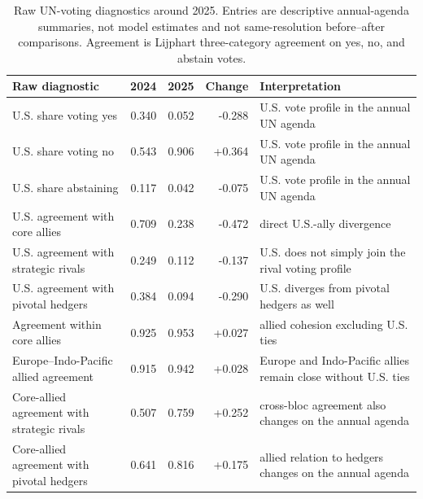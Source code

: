 \begin{table}[ht]
\centering
\caption{Raw UN-voting diagnostics around 2025. Entries are descriptive annual-agenda summaries, not model estimates and not same-resolution before--after comparisons. Agreement is Lijphart three-category agreement on yes, no, and abstain votes.}
\label{tab:raw-un-diagnostics}
\scriptsize
\begin{tabularx}{\textwidth}{@{}X r r r X@{}}
\toprule
\textbf{Raw diagnostic} & \textbf{2024} & \textbf{2025} & \textbf{Change} & \textbf{Interpretation} \\
\midrule
U.S. share voting yes & 0.340 & 0.052 & -0.288 & U.S. vote profile in the annual UN agenda \\
U.S. share voting no & 0.543 & 0.906 & +0.364 & U.S. vote profile in the annual UN agenda \\
U.S. share abstaining & 0.117 & 0.042 & -0.075 & U.S. vote profile in the annual UN agenda \\
U.S. agreement with core allies & 0.709 & 0.238 & -0.472 & direct U.S.-ally divergence \\
U.S. agreement with strategic rivals & 0.249 & 0.112 & -0.137 & U.S. does not simply join the rival voting profile \\
U.S. agreement with pivotal hedgers & 0.384 & 0.094 & -0.290 & U.S. diverges from pivotal hedgers as well \\
Agreement within core allies & 0.925 & 0.953 & +0.027 & allied cohesion excluding U.S. ties \\
Europe--Indo-Pacific allied agreement & 0.915 & 0.942 & +0.028 & Europe and Indo-Pacific allies remain close without U.S. ties \\
Core-allied agreement with strategic rivals & 0.507 & 0.759 & +0.252 & cross-bloc agreement also changes on the annual agenda \\
Core-allied agreement with pivotal hedgers & 0.641 & 0.816 & +0.175 & allied relation to hedgers changes on the annual agenda \\
\bottomrule
\end{tabularx}
\end{table}
